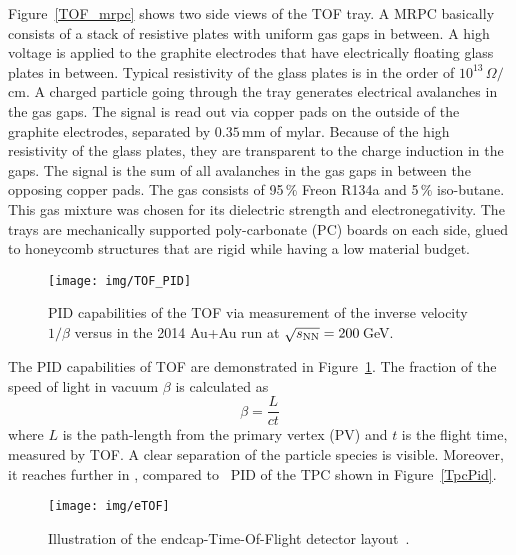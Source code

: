 Figure~\ref{TOF_mrpc} shows two side views of the TOF tray. A MRPC basically consists of a stack of resistive plates with uniform gas gaps in between. A high voltage is applied to the graphite electrodes that have electrically floating glass plates in between. Typical resistivity of the glass plates is in the order of $10^{13}\,\Omega/$cm. A charged particle going through the tray generates electrical avalanches in the gas gaps. The signal is read out via copper pads on the outside of the graphite electrodes, separated by $0.35\,$mm of mylar. Because of the high resistivity of the glass plates, they are transparent to the charge induction in the gaps. The signal is the sum of all avalanches in the gas gaps in between the opposing copper pads. The gas consists of 95$\,\%$ Freon R134a and 5$\,\%$ iso-butane. This gas mixture was chosen for its dielectric strength and electronegativity. The trays are mechanically supported poly-carbonate (PC) boards on each side, glued to honeycomb structures that are rigid while having a low material budget.

\begin{figure}[!htb]
\begin{center}
 \texttt{[image: img/TOF\_PID]}\\
\end{center}
\caption[PID capabilities of the TOF via measurement of the inverse velocity versus \pt in the 2014 Au+Au run at $\snn = 200\,$GeV\@.]{\label{TOF_pid}PID capabilities of the TOF via measurement of the inverse velocity $1/\beta$ versus \pt in the 2014 Au+Au run at $\snn = 200\,$GeV\@. }
\end{figure}

The PID capabilities of TOF are demonstrated in Figure~\ref{TOF_pid}\@. The fraction of the speed of light in vacuum $\beta$ is calculated as
\begin{equation}
 \beta = \frac{L}{ct}
\end{equation}
where $L$ is the path-length from the primary vertex (PV) and $t$ is the flight time, measured by TOF\@.
A clear separation of the particle species is visible. Moreover, it reaches further in \pt, compared to \dedx\ PID of the TPC shown in Figure~\ref{TpcPid}\@.

\begin{figure}[!htb]
\begin{center}
 \texttt{[image: img/eTOF]}\\
\end{center}
\caption[Illustration of the endcap-Time-Of-Flight detector layout.]{\label{eTOF}Illustration of the endcap-Time-Of-Flight detector layout~\cite{eTOF}. }
\end{figure}

